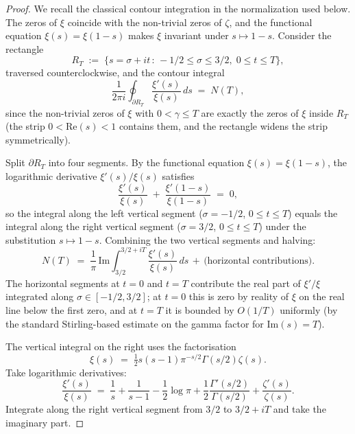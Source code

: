 \begin{proof}
We recall the classical contour integration in the normalization used
below. The zeros of \(\xi\) coincide with the
non-trivial zeros of \(\zeta\), and the functional equation
\(\xi(s)=\xi(1-s)\) makes \(\xi\) invariant under
\(s\mapsto 1-s\). Consider the rectangle
\[
R_{T}\;:=\;\{s=\sigma+it\,:\,-1/2\leq\sigma\leq 3/2,\;0\leq t\leq T\},
\]
traversed counterclockwise, and the contour integral
\begin{equation}
\label{v4-arith:w5-i:eq:contour}
\frac{1}{2\pi i}\oint_{\partial R_{T}}\frac{\xi'(s)}{\xi(s)}\,ds\;=\;N(T),
\end{equation}
since the non-trivial zeros of \(\xi\) with \(0<\gamma\leq T\) are exactly
the zeros of \(\xi\) inside \(R_{T}\) (the strip \(0<\mathrm{Re}(s)<1\)
contains them, and the rectangle widens the strip symmetrically).

Split \(\partial R_{T}\) into four segments. By the functional equation
\(\xi(s)=\xi(1-s)\), the logarithmic derivative \(\xi'(s)/\xi(s)\)
satisfies
\begin{equation}
\label{v4-arith:w5-i:eq:log-der-sym}
\frac{\xi'(s)}{\xi(s)}\;+\;\frac{\xi'(1-s)}{\xi(1-s)}\;=\;0,
\end{equation}
so the integral along the left vertical segment (\(\sigma=-1/2\),
\(0\leq t\leq T\)) equals the integral along the right vertical segment
(\(\sigma=3/2\), \(0\leq t\leq T\)) under the substitution
\(s\mapsto 1-s\). Combining the two vertical segments and halving:
\begin{equation}
\label{v4-arith:w5-i:eq:vert-sum}
N(T)\;=\;\frac{1}{\pi}\,\mathrm{Im}\int_{3/2}^{3/2+iT}\frac{\xi'(s)}{\xi(s)}\,ds\,+\,\text{(horizontal contributions)}.
\end{equation}
The horizontal segments at \(t=0\) and \(t=T\) contribute the real part
of \(\xi'/\xi\) integrated along \(\sigma\in[-1/2,3/2]\); at \(t=0\) this is
zero by reality of \(\xi\) on the real line below the first zero, and at
\(t=T\) it is bounded by \(O(1/T)\) uniformly (by the standard
Stirling-based estimate on the gamma factor for
\(\mathrm{Im}(s)=T\)).

The vertical integral on the right uses the factorisation
\begin{equation}
\label{v4-arith:w5-i:eq:xi-factorisation}
\xi(s)\;=\;\tfrac{1}{2}s(s-1)\pi^{-s/2}\Gamma(s/2)\zeta(s).
\end{equation}
Take logarithmic derivatives:
\begin{equation}
\label{v4-arith:w5-i:eq:log-xi-prime}
\frac{\xi'(s)}{\xi(s)}\;=\;\frac{1}{s}+\frac{1}{s-1}-\frac{1}{2}\log\pi+\frac{1}{2}\frac{\Gamma'(s/2)}{\Gamma(s/2)}+\frac{\zeta'(s)}{\zeta(s)}.
\end{equation}
Integrate along the right vertical segment from \(3/2\) to \(3/2+iT\) and
take the imaginary part.


\end{proof}
